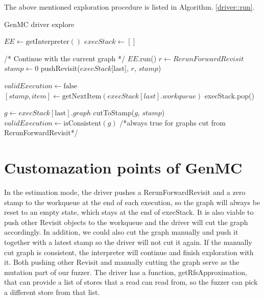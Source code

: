 The above mentioned exploration procedure is listed in Algorithm. \ref{driver::run}.

\begin{algorithm}
	\caption{GenMC driver explore}
	\label{driver::run}
	\begin{algorithmic}[1]
		\STATE $EE \leftarrow \text{getInterpreter}()$
		\STATE $execStack \leftarrow []$

		\STATE /* Continue with the current graph */
		\STATE $EE$.run()
		\STATE $r \leftarrow RerunForwardRevisit$
		\STATE $stamp \leftarrow 0$
		\STATE pushRevisit($execStack$[last], $r$, $stamp$)

		\STATE $validExecution \leftarrow \text{false}$
		\STATE $[{stamp}, {item}] \leftarrow \text{getNextItem}(execStack[last].workqueue)$
		\STATE execStack.pop()
		\STATE {}
		\ELSE
		\RETURN
		\ENDIF

		\ELSE
		\STATE $g \leftarrow execStack[\text{last}].graph$
		\STATE cutToStamp($g$, $stamp$)
		\STATE $validExecution \leftarrow \text{isConsistent}(g)$   /*always true for graphs cut from RerunForwardRevisit*/
		\ENDIF
		\ENDWHILE
		\ENDWHILE
	\end{algorithmic}
\end{algorithm}





\section{Customazation points of GenMC}

In the estimation mode, the driver pushes a RerunForwardRevisit and a zero stamp to the workqueue at the end of each execution, so the graph will always be reset to an empty state, which stays at the end of execStack. It is also viable to push other Revisit objects to the workqueue and the driver will cut the graph accordingly. In addition, we could also cut the graph manually and push it together with a latest stamp so the driver will not cut it again. If the manually cut graph is consistent, the interpreter will continue and finish exploration with it. Both pushing other Revisit and manually cutting the graph serve as the mutation part of our fuzzer. The driver has a function, getRfsApproximation, that can provide a list of stores that a read can read from, so the fuzzer can pick a different store from that list.

